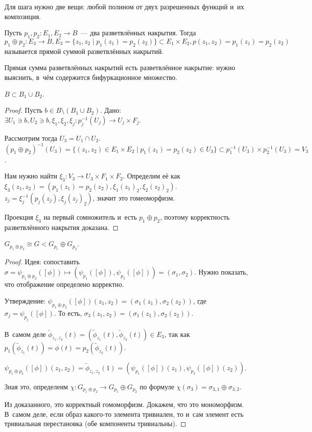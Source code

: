 \documentclass{article}
\begin{document}
Для шага нужно две вещи: любой полином от двух разрешенных функций и~их
композиция.

\begin{definition}
	Пусть $p_1, p_2: E_1, E_2 \rightarrow B$~--- два разветвлённых накрытия. Тогда
	$p_1 \oplus p_2: E_3 \rightarrow B, E_3 = \{z_1, z_2 \mid p_1(z_1) =
	p_2(z_2)\} \subset E_1 \times E_2, p(z_1, z_2) = p_1(z_1) = p_2(z_2)$
	называется прямой суммой разветвлённых накрытий.
\end{definition}

Прямая сумма разветвлённых накрытий есть разветвлённое накрытие: нужно выяснить,
в~чём содержится бифуркационное множество.
\begin{claim}
	$B \subset B_1 \cup B_2$.
\end{claim}
\begin{proof}
	Пусть $b \in B \setminus (B_1 \cup B_2)$. Дано: $\exists U_1 \ni b, U_2 \ni
	b, \xi_1, \xi_2, \xi_j: p_j^{-1}(U_j) \rightarrow U_j \times F_j$.

	Рассмотрим тогда $U_3 = U_1 \cap U_2$. $(p_1 \oplus p_2)^{-1}(U_3) = \{(z_1,
	z_2) \in E_1 \times E_2 \mid p_1(z_1) = p_2(z_2) \in U_3\} \subset
	p_1^{-1}(U_3) \times p_2^{-1}(U_3) = V_3$.

	Нам нужно найти $\xi_3: V_3 \rightarrow U_3 \times F_1 \times F_2$. Определим
	её как~$\xi_3(z_1, z_2) = (p_1(z_1) = p_2(z_2), \xi_1(z_1)_2, \xi_2(z_2)_2)$.
	$z_j = \xi_j^{-1}(p_j(z_j), \xi_j(z_j)_2)$, значит это гомеоморфизм.

	Проекция $\xi_3$ на первый сомножитель и~есть $p_1 \oplus p_2$, поэтому
	корректность разветвлённого накрытия доказана.
\end{proof}

\begin{claim}
	$G_{p_1 \oplus p_2} \cong G < G_{p_1} \oplus G_{p_2}$.
\end{claim}
\begin{proof}
	Идея: сопоставить $\sigma = \psi_{p_1 \oplus p_2}([\phi]) \mapsto
	(\psi_{p_1}([\phi]), \psi_{p_2}([\phi])) = (\sigma_1, \sigma_2)$. Нужно
	показать, что отображение определено корректно.

	Утверждение:
	$\psi_{p_1 \oplus p_2}([\phi])(z_1, z_2) = (\sigma_1(z_1), \sigma_2(z_2))$,
	где $\sigma_j = \psi_{p_j}([\phi])$. То есть, $\sigma_3(z_1, z_2) =
	(\sigma_1(z_1), \sigma_2(z_2))$.

	В~самом деле
	$\widetilde{\phi}_{z_1,z_2}(t) = (\widetilde{\phi}_{z_1}(t),
	\widetilde{\phi}_{z_2}(t)) \in E_3$, так как $p_1(\widetilde\phi_{z_1}(t)) =
	\phi(t) = p_2(\widetilde\phi_{z_2}(t))$.

	$\psi_{p_1 \oplus p_2}([\phi])(z_1, z_2) = \widetilde\phi_{z_1,z_2}(1) =
	(\psi_{p_1}([\phi])(z_1), \psi_{p_2}([\phi])(z_2))$.

	Зная это, определеим $\chi: G_{p_1 \oplus p_2} \rightarrow G_{p_1} \oplus
	G_{p_2}$ по формуле $\chi(\sigma_3) = \sigma_{3,1} \oplus \sigma_{3,2}$.

	Из доказанного, это корректный гомоморфизм. Докажем, что это мономорфизм.
	В~самом деле, если образ какого-то элемента тривиален, то и~сам элемент есть
	тривиальная перестановка (обе компоненты тривиальны).
\end{proof}
\end{document}

